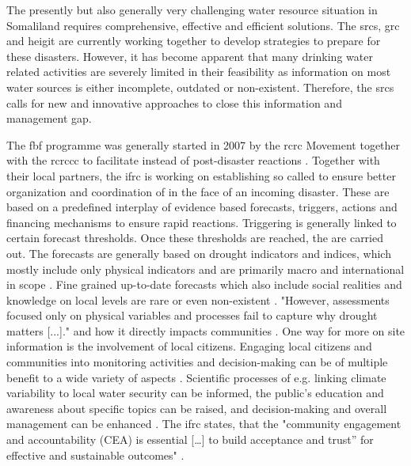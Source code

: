 The presently but also generally very challenging water resource situation in Somaliland requires comprehensive, effective and efficient solutions. The \acrfull{srcs}, \acrfull{grc} and \acrfull{heigit} are currently working together to develop strategies to prepare for these disasters. However, it has become apparent that many drinking water related activities are severely limited in their feasibility as information on most water sources is either incomplete, outdated or non-existent. Therefore, the \acrshort{srcs} calls for new and innovative approaches to close this information and management gap.

The \acrshort{fbf} programme was generally started in 2007 by the \acrlong{rcrc} Movement together with the \acrlong{rcrccc} to facilitate  instead of post-disaster reactions \autocite{ifrcForecastbasedFinancingNew2019}. Together with their local partners, the \acrfull{ifrc} is working on establishing so called  to ensure better organization and coordination of  in the face of an incoming disaster. These  are based on a predefined interplay of evidence based forecasts, triggers, actions and financing mechanisms to ensure rapid reactions.\newline
Triggering  is generally linked to certain forecast thresholds. Once these thresholds are reached, the  are carried out. The forecasts are generally based on drought indicators and indices, which mostly include only physical indicators and are primarily macro and international in scope \autocite{svobodaHandbookDroughtIndicators2016}. Fine grained up-to-date forecasts which also include social realities and knowledge on local levels are rare or even non-existent \autocite{enenkelWhyPredictClimate2020,masindeFrameworkPredictingDroughts2010a}. "However, assessments focused only on physical variables and processes fail to capture why drought matters [...]."\autocite[3]{lackstromBackyardHydroclimatologyCitizen2022} and how it directly impacts communities \autocite{boultDroughtImpactbasedForecasting2022,enenkelWhyPredictClimate2020}.\newline
One way for more on site information is the involvement of local citizens. Engaging local citizens and communities into monitoring activities and decision-making can be of multiple benefit to a wide variety of aspects \autocite{scrsFeasibilityStudyPotential2022, njambi-szlapkaIntegratingCommunityVoices}. Scientific processes of e.g. linking climate variability to local water security can be informed, the public's education and awareness about specific topics can be raised, and decision-making and overall management can be enhanced \autocite{huangManagementDrinkingWater2020,kirschkeCitizenScienceProjects2022,minkmanCitizenScienceWater2015}. The \acrshort{ifrc} states, that the "community engagement and accountability (CEA) is essential [\dots] to build acceptance and trust” for effective and sustainable outcomes" \autocite{ifrcCommunityEngagementAccountability}.


